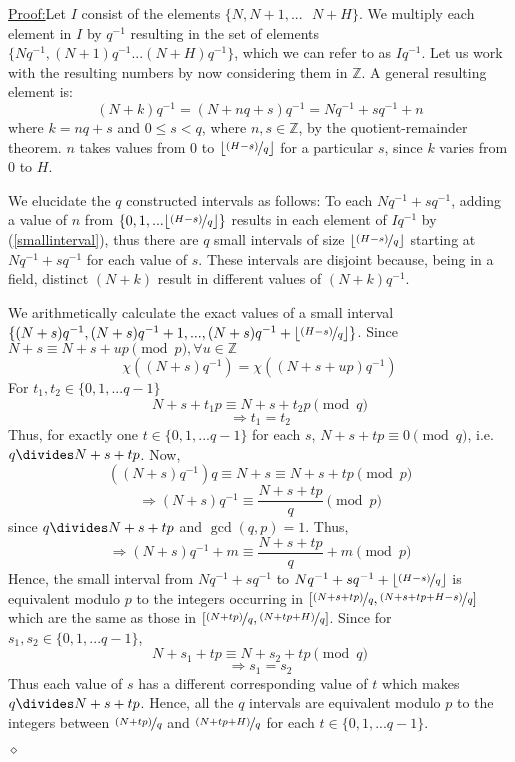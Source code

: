 \documentclass{report}
\newenvironment{claimproof}[1]{\vspace{2.5mm}\par\noindent\underline{Proof:}\space#1}{\hfill $\diamond$ \vspace{2.5mm} \par}
\begin{document}
\begin{claimproof}
Let $I$ consist of the elements $\{N,N+1,...\text{ }N+H\}$. We multiply each element in $I$ by $q^{-1}$ resulting in the set of elements $\{Nq^{-1},(N+1)q^{-1}...(N+H)q^{-1}\}$, which we can refer to as $Iq^{-1}$. Let us work with the resulting numbers by now considering them in $\mathbb{Z}$. A general resulting element is:
\begin{equation} \label{smallinterval}
    (N+k)q^{-1}=(N+nq+s)q^{-1}=Nq^{-1}+sq^{-1}+n
\end{equation}
where $k=nq+s$ and $0\leq s<q$, where $n,s\in\mathbb{Z}$, by the quotient-remainder theorem. $n$ takes values from $0$ to $\lfloor\nicefrac{(H-s)}{q}\rfloor$ for a particular $s$, since $k$ varies from $0$ to $H$.

We elucidate the $q$ constructed intervals as follows: To each $Nq^{-1}+sq^{-1}$, adding a value of $n$ from $\{0,1,...\lfloor\nicefrac{(H-s)}{q}\rfloor\}$ results in each element of $Iq^{-1}$ by (\ref{smallinterval}), thus there are $q$ small intervals of size $\lfloor\nicefrac{(H-s)}{q}\rfloor$ starting at $Nq^{-1}+sq^{-1}$ for each value of $s$. These intervals are disjoint because, being in a field, distinct $(N+k)$ result in different values of $(N+k)q^{-1}$.

We arithmetically calculate the exact values of a small interval $\{(N+s)q^{-1},(N+s)q^{-1}+1, ...,(N+s)q^{-1}+\lfloor\nicefrac{(H-s)}{q}\rfloor\}$. Since $N+s\equiv N+s+up\pmod p, \forall u\in \mathbb{Z}$
\[\chi((N+s)q^{-1})=\chi((N+s+up)q^{-1})\]
For $t_1,t_2\in\{0, 1,... q-1\}$
\[N+s+t_1p \equiv N+s+t_2p \pmod q\]
\[\Rightarrow t_1=t_2\]
Thus, for exactly one $t\in\{0, 1,... q-1\}$ for each $s$, $N+s+tp \equiv 0 \pmod q$, i.e. $q\divides N+s+tp$. Now,
\[((N+s)q^{-1})q\equiv N+s \equiv N+s+tp \pmod p\]
\[\Rightarrow (N+s)q^{-1} \equiv \frac{N+s+tp}{q} \pmod p\]
since $q\divides N+s+tp$ and $\gcd (q,p)=1$. Thus,
\[\Rightarrow (N+s)q^{-1} + m\equiv \frac{N+s+tp}{q} + m \pmod p\]
Hence, the small interval from $Nq^{-1}+sq^{-1}$ to $Nq^{-1}+sq^{-1} + \lfloor\nicefrac{(H-s)}{q}\rfloor$ is equivalent modulo $p$ to the integers occurring in $[\nicefrac{(N+s+tp)}{q},\nicefrac{(N+s+tp+H-s)}{q}]$ which are the same as those in $[\nicefrac{(N+tp)}{q},\nicefrac{(N+tp+H)}{q}]$. Since for $s_1,s_2\in\{0, 1,... q-1\}$,
\[N+s_1+tp \equiv N+s_2+tp \pmod q\]
\[\Rightarrow s_1=s_2\]
Thus each value of $s$ has a different corresponding value of $t$ which makes $q\divides N+s+tp$. Hence, all the $q$ intervals are equivalent modulo $p$ to the integers between $\nicefrac{(N+tp)}{q}$ and $\nicefrac{(N+tp+H)}{q}$ for each $t\in\{0,1,...q-1\}$.


\end{claimproof}
\end{document}
